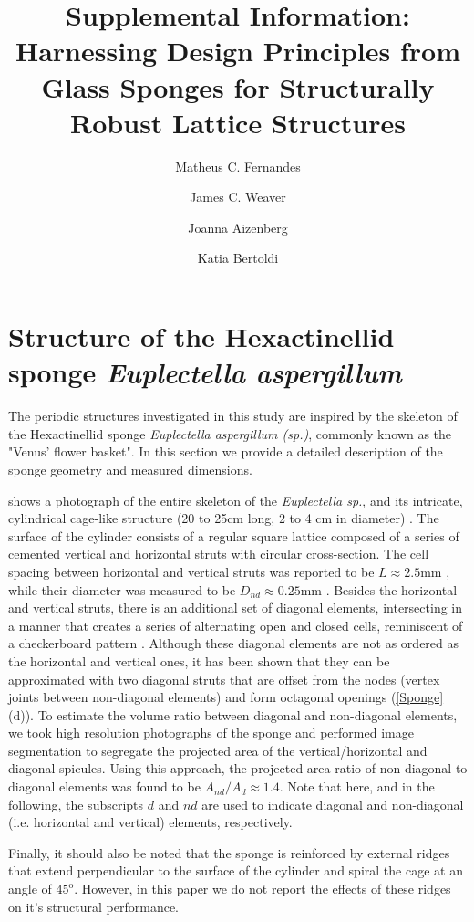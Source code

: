 \documentclass[10pt,twoside]{fernandes_supp}
\title{Supplemental Information:\\ Harnessing  Design Principles from Glass Sponges for Structurally Robust Lattice Structures}
\author[1]{Matheus C. Fernandes}
\author[2]{James C. Weaver}
\author[1,2,3]{Joanna Aizenberg}
\author[1,2,3,*]{Katia Bertoldi}
\affil[1]{John A. Paulson School of Engineering and Applied Sciences -- Harvard University, Cambridge, MA 02138}
\affil[2]{Wyss Institute -- Harvard University, Cambridge, MA 02138}
\affil[3]{Kavli Institute -- Harvard University, Cambridge, MA 02138}
\affil[*]{Corresponding author: \href{mailto:bertoldi@seas.harvard.edu}{bertoldi@seas.harvard.edu}}
\begin{document}
\maketitle
\section{Structure of the Hexactinellid sponge \textit{Euplectella aspergillum}}\label{sec:params}
The periodic structures investigated in this study are inspired by the skeleton of the Hexactinellid sponge \textit{Euplectella aspergillum (sp.)}, commonly known as the "Venus' flower basket". In this section we provide a detailed description of the sponge geometry and measured dimensions.

 shows a photograph of the entire skeleton of the \textit{Euplectella sp.}, and its intricate, cylindrical cage-like structure (20 to 25cm long, 2 to 4 cm in diameter) \citep{aizenberg2005}. The surface of the cylinder consists of a regular square lattice composed of a series of cemented vertical and horizontal struts with circular cross-section. The cell spacing between horizontal and vertical struts was reported  to be $L\approx 2.5$mm \citep{weaver2007}, while their diameter was measured to be $D_{nd}\approx 0.25$mm \citep{weaver2007}. Besides the horizontal and vertical struts, there is an additional set of diagonal elements, intersecting in a manner that creates a series of alternating open and closed cells, reminiscent of a checkerboard pattern \citep{weaver2007}. Although these diagonal elements are not as ordered as the horizontal and vertical ones, it has been shown that they can be approximated with two diagonal struts that are offset from the nodes  (vertex joints between non-diagonal elements) and form octagonal openings (\cref{Sponge}(d)). To estimate the volume ratio between diagonal and non-diagonal elements, we took high resolution photographs of the sponge and performed image segmentation to segregate the projected area of the vertical/horizontal and diagonal spicules. Using this approach, the projected area ratio of non-diagonal to diagonal elements was found to be $A_{nd}/A_{d}\approx1.4$. Note that here, and in the following, the subscripts $d$ and $nd$ are used to indicate diagonal and non-diagonal (i.e. horizontal and vertical) elements, respectively. 

Finally, it should also be noted that the sponge is reinforced by external ridges that extend perpendicular to the surface of the cylinder and spiral the cage at an angle of $45^\text{o}$. However, in this paper we do not report the effects of these ridges on it's structural performance.
\end{document}
